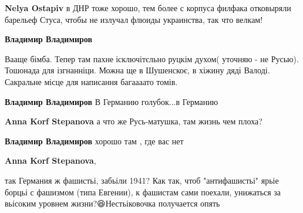 \begin{itemize}
\begin{itemize}
\textbf{Nelya Ostapiv} в ДНР тоже хорошо, тем более с корпуса филфака отковыряли барельеф Стуса, чтобы не излучал флюиды украинства, так что велкам!

 
\textbf{Владимир Владимиров} 

Вааще бімба. Тепер там пахне🤮ісключітєльно руцкім духом( уточняю - не Русью). Тошонада для ізгнанніци.
Можна ще в Шушенскоє, в хіжину дяді Валоді. Сакральне місце для написання багаааато томів.

 
\textbf{Владимир Владимиров}
В Германию голубок...в Германию

 
\textbf{Anna Korf Stepanova} а что же Русь-матушка, там жизнь чем плоха?

 
\textbf{Владимир Владимиров}
хорошо там , где вас нет

 
\textbf{Anna Korf Stepanova},

так Германия ж фашистьі, забьіли 1941? Как так, чтоб "антифашистьі" ярьіе
борцьі с фашизмом (типа Евгении), к фашистам сами поехали, унижаться за
вьісоким уровнем жизни?😆Нестьіковочка получается опять


 

\end{itemize}
\end{itemize}
